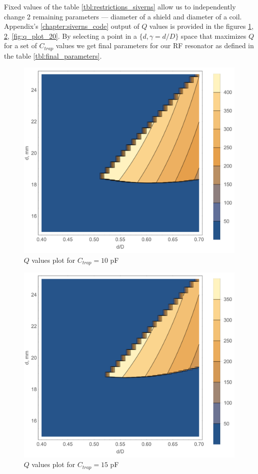 Fixed values of the table \ref{tbl:restrictions_siverns} allow us to independently change 2 remaining parameters --- diameter of a shield and diameter of a coil. Appendix's \ref{chapter:siverns_code} output of $Q$ values is provided in the figures \ref{fig:q_plot_10}, \ref{fig:q_plot_15}, \ref{fig:q_plot_20}. By selecting a point in a $\{d, \gamma = d / D\}$ space that maximizes $Q$ for a set of $C_{trap}$ values we get final parameters for our RF resonator as defined in the table \ref{tbl:final_parameters}.
\FloatBarrier
\begin{figure}[h!]
\centering
\includegraphics[width=.78\textwidth]{images/q_plot_siverns_tex_10}
\caption{$Q$ values plot for $C_{trap} = 10$ pF}
\label{fig:q_plot_10}
\end{figure}
\begin{figure}[h!]
\centering
\includegraphics[width=.78\textwidth]{images/q_plot_siverns_tex_15}
\caption{$Q$ values plot for $C_{trap} = 15$ pF}
\label{fig:q_plot_15}
\end{figure}
